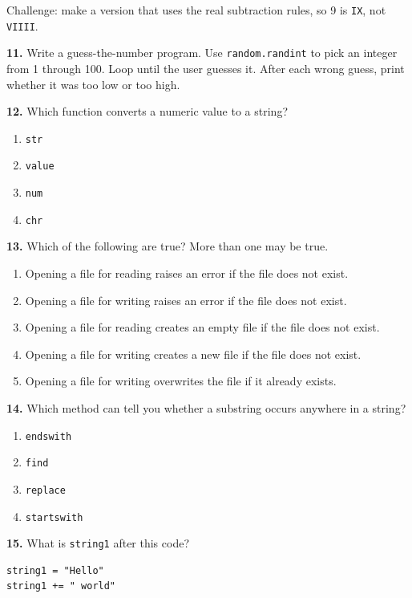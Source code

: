 \documentclass[11pt]{article}
\begin{document}
Challenge: make a version that uses the real subtraction rules, so 9 is \texttt{IX}, not \texttt{VIIII}.

\textbf{11.} Write a guess-the-number program. Use \texttt{random.randint} to pick an integer from 1 through 100. Loop until the user guesses it. After each wrong guess, print whether it was too low or too high.

\textbf{12.} Which function converts a numeric value to a string?

\begin{enumerate}
    \item[a.] \texttt{str}
    \item[b.] \texttt{value}
    \item[c.] \texttt{num}
    \item[d.] \texttt{chr}
\end{enumerate}

\textbf{13.} Which of the following are true? More than one may be true.

\begin{enumerate}
    \item[a.] Opening a file for reading raises an error if the file does not exist.
    \item[b.] Opening a file for writing raises an error if the file does not exist.
    \item[c.] Opening a file for reading creates an empty file if the file does not exist.
    \item[d.] Opening a file for writing creates a new file if the file does not exist.
    \item[e.] Opening a file for writing overwrites the file if it already exists.
\end{enumerate}

\textbf{14.} Which method can tell you whether a substring occurs anywhere in a string?

\begin{enumerate}
    \item[a.] \texttt{endswith}
    \item[b.] \texttt{find}
    \item[c.] \texttt{replace}
    \item[d.] \texttt{startswith}
\end{enumerate}

\textbf{15.} What is \texttt{string1} after this code?

\begin{lstlisting}
string1 = "Hello"
string1 += " world"
\end{lstlisting}
\end{document}
